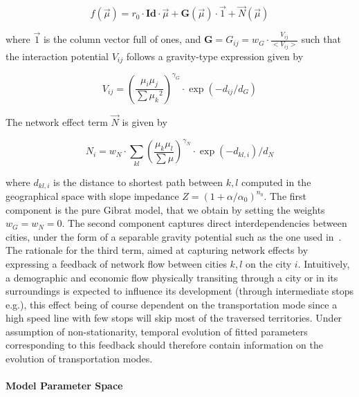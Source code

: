 \documentclass[Royal,sageh,times]{sagej}
\begin{document}
\begin{equation}
f(\vec{\mu}) = r_0\cdot \mathbf{Id}\cdot \vec{\mu} + \mathbf{G}\left(\vec{\mu}\right)\cdot \vec{1} + \vec{N}\left(\vec{\mu}\right)
\end{equation}


where $\vec{1}$ is the column vector full of ones, and $\mathbf{G} = G_{ij} = w_G\cdot \frac{V_{ij}}{<V_{ij}>}$ such that the interaction potential $V_{ij}$ follows a gravity-type expression given by 

\begin{equation}
V_{ij} = \left(\frac{\mu_i\mu_j}{\sum{\mu_k}^2}\right)^{\gamma_G}\cdot \exp{(-d_{ij}/d_G)}
\end{equation}

The network effect term $\vec{N}$ is given by


\begin{equation}
N_{i} = w_N \cdot \sum_{kl} \left(\frac{\mu_k\mu_l}{\sum\mu}\right)^{\gamma_N} \cdot \exp{(-d_{kl,i})/d_N}
\end{equation}

where $d_{kl,i}$ is the distance to shortest path between $k,l$ computed in the geographical space with slope impedance $Z=\left(1+\alpha/\alpha_0\right)^{n_0}$. The first component is the pure Gibrat model, that we obtain by setting the weights $w_G = w_N = 0$. The second component captures direct interdependencies between cities, under the form of a separable gravity potential such as the one used in~\cite{sanders1992systeme}. The rationale for the third term, aimed at capturing network effects by expressing a feedback of network flow between cities $k,l$ on the city $i$. Intuitively, a demographic and economic flow physically transiting through a city or in its surroundings is expected to influence its development (through intermediate stops e.g.), this effect being of course dependent on the transportation mode since a high speed line with few stops will skip most of the traversed territories.
 Under assumption of non-stationarity, temporal evolution of fitted parameters corresponding to this feedback should therefore contain information on the evolution of transportation modes.




\paragraph{Model Parameter Space}
\end{document}
